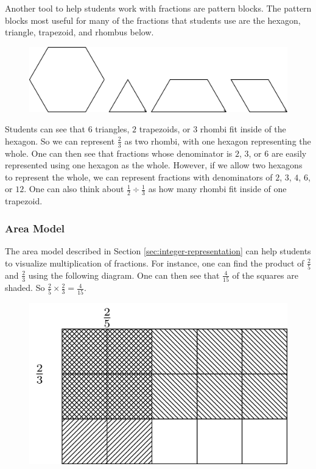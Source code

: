 \documentclass[
]{book}
\theoremstyle{definition}
\theoremstyle{definition}
\theoremstyle{definition}
\theoremstyle{definition}
\theoremstyle{remark}
\begin{document}
Another tool to help students work with fractions are pattern blocks. The pattern blocks most useful for many of the fractions that students use are the hexagon, triangle, trapezoid, and rhombus below.

\begin{figure}

{\centering \includegraphics[width=0.6\linewidth]{tikz/pattern-blocks} 

}

\end{figure}

Students can see that \(6\) triangles, \(2\) trapezoids, or \(3\) rhombi fit inside of the hexagon. So we can represent \(\frac{2}{3}\) as two rhombi, with one hexagon representing the whole. One can then see that fractions whose denominator is \(2\), \(3\), or \(6\) are easily represented using one hexagon as the whole. However, if we allow two hexagons to represent the whole, we can represent fractions with denominators of \(2\), \(3\), \(4\), \(6\), or \(12\). One can also think about \(\frac{1}{2} \div \frac{1}{3}\) as how many rhombi fit inside of one trapezoid.

\hypertarget{area-model-1}{%
\subsubsection{Area Model}\label{area-model-1}}

The area model described in Section \ref{sec:integer-representation} can help students to visualize multiplication of fractions. For instance, one can find the product of \(\frac{2}{5}\) and \(\frac{2}{3}\) using the following diagram. One can then see that \(\frac{4}{15}\) of the squares are shaded. So \(\frac{2}{5} \times \frac{2}{3} = \frac{4}{15}\).

\begin{figure}

{\centering \includegraphics[width=0.6\linewidth]{tikz/area-model-fractions} 

}

\end{figure}
\end{document}
